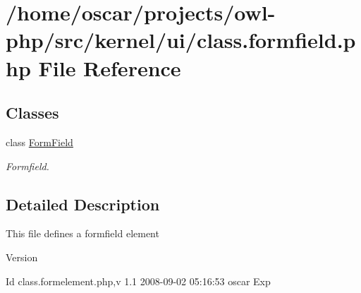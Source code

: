 \section{/home/oscar/projects/owl-\/php/src/kernel/ui/class.formfield.php File Reference}
\label{class_8formfield_8php}
\subsection*{Classes}
\begin{DoxyCompactItemize}
\item 
class \hyperlink{classFormField}{FormField}
\begin{DoxyCompactList}\small\item\em Formfield. \item\end{DoxyCompactList}\end{DoxyCompactItemize}


\subsection{Detailed Description}
This file defines a formfield element \begin{DoxyVersion}{Version}

\end{DoxyVersion}
\begin{DoxyParagraph}{Id}
class.formelement.php,v 1.1 2008-\/09-\/02 05:16:53 oscar Exp 
\end{DoxyParagraph}
